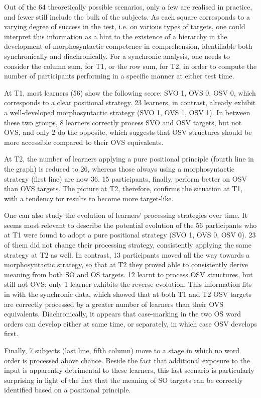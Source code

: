 Out of the 64 theoretically possible scenarios, only a few are realised in practice, and fewer still include the bulk of the subjects. As each square corresponds to a varying degree of success in the test, i.e. on various types of targets, one could interpret this information as a hint to the existence of a hierarchy in the development of morphosyntactic competence in comprehension, identifiable both synchronically and diachronically. For a synchronic analysis, one needs to consider the column sum, for T1, or the row sum, for T2, in order to compute the number of participants performing in a specific manner at either test time. 

At T1, most learners (56) show the following score: SVO 1, OVS 0, OSV 0, which corresponds to a clear positional strategy. 23 learners, in contrast, already exhibit a well-developed morphosyntactic strategy (SVO 1, OVS 1, OSV 1). In between these two groups, 8 learners correctly process SVO and OSV targets, but not OVS, and only 2 do the opposite, which suggests that OSV structures should be more accessible compared to their OVS equivalents. 

At T2, the number of learners applying a pure positional principle (fourth line in the graph) is reduced to 26, whereas those always using a morphosyntactic strategy (first line) are now 36. 15 participants, finally, perform better on OSV than OVS targets. The picture at T2, therefore, confirms the situation at T1, with a tendency for results to become more target-like.

One can also study the evolution of learners' processing strategies over time. It seems most relevant to describe the potential evolution of the 56 participants who at T1 were found to adopt a pure positional strategy (SVO 1, OVS 0, OSV 0). 23 of them did not change their processing strategy, consistently applying the same strategy at T2 as well. In contrast, 13 participants moved all the way towards a morphosyntactic strategy, so that at T2 they proved able to consistently derive meaning from both SO and OS targets. 12 learnt to process OSV structures, but still not OVS; only 1 learner exhibits the reverse evolution. This information fits in with the synchronic data, which showed that at both T1 and T2 OSV targets are correctly processed by a greater number of learners than their OVS equivalents. Diachronically, it appears that case-marking in the two OS word orders can develop either at same time, or separately, in which case OSV develops first. 

Finally, 7 subjects (last line, fifth column) move to a stage in which no word order is processed above chance. Beside the fact that additional exposure to the input is apparently detrimental to these learners, this last scenario is particularly surprising in light of the fact that the meaning of SO targets can be correctly identified based on a positional principle.

